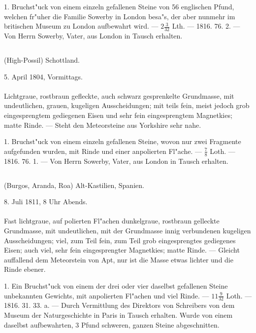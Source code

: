 \documentclass[a4paper, 11pt, oneside, polutonikogreek, german]{article}
\begin{document}
1. Bruchst"uck von einem einzeln gefallenen Steine von 56 englischen Pfund, welchen fr"uher die Familie Sowerby in London besa"s, der aber nunmehr im britischen Museum zu London aufbewahrt wird. --- $\mathfrak{2\frac{3}{32}}$ Lth. --- 1816. 76. 2. --- Von Herrn Sowerby, Vater, aus London in Tausch erhalten.
\subsection{}
\begin{center}

(High-Possil) Schottland.

5. April 1804, Vormittags.
\end{center}
\paragraph{}
Lichtgraue, rostbraun gefleckte, auch schwarz gesprenkelte Grundmasse, mit undeutlichen, grauen, kugeligen Ausscheidungen; mit teils fein, meist jedoch grob eingesprengtem gediegenen Eisen und sehr fein eingesprengtem Magnetkies; matte Rinde. --- Steht den Meteorsteine aus Yorkshire sehr nahe.

1. Bruchst"uck von einem einzeln gefallenen Steine, wovon nur zwei Fragmente aufgefunden wurden, mit Rinde und einer anpolierten Fl"ache. --- $\mathfrak{\frac{7}{8}}$ Loth. --- 1816. 76. 1. --- Von Herrn Sowerby, Vater, aus London in Tausch erhalten.
\subsection{}
\begin{center}

(Burgos, Aranda, Roa) Alt-Kastilien, Spanien.

8. Juli 1811, 8 Uhr Abends.
\end{center}
\paragraph{}
Fast lichtgraue, auf polierten Fl"achen dunkelgraue, rostbraun gelleckte Grundmasse, mit undeutlichen, mit der Grundmasse innig verbundenen kugeligen Ausscheidungen; viel, zum Teil fein, zum Teil grob eingesprengtes gediegenes Eisen; auch viel, sehr fein eingesprengter Magnetkies; matte Rinde. --- Gleicht auffallend dem Meteorstein von Apt, nur ist die Masse etwas lichter und die Rinde ebener.

1. Ein Bruchst"uck von einem der drei oder vier daselbst gefallenen Steine unbekannten Gewichts, mit anpolierten Fl"achen und viel Rinde. --- $\mathfrak{11\frac{9}{32}}$ Loth. --- 1816. 31. 33. a. --- Durch Vermittlung des Direktors von Schreibers von dem Museum der Naturgeschichte in Paris in Tausch erhalten. Wurde von einem daselbst aufbewahrten, 3 Pfund schweren, ganzen Steine abgeschnitten.
\end{document}
